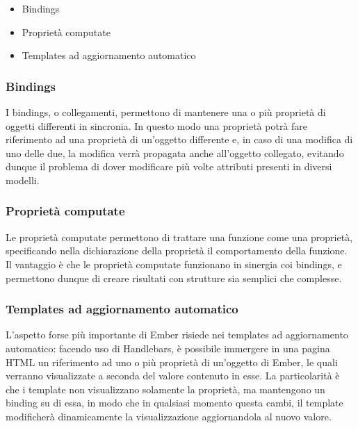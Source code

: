\begin{itemize}
    \item Bindings
    \item Proprietà computate
    \item Templates ad aggiornamento automatico
\end{itemize}

\subsubsection{Bindings} %
\label{ssub:bindings}
I bindings, o collegamenti, permettono di mantenere una o più proprietà di oggetti differenti in sincronia. In questo modo una proprietà potrà fare riferimento ad una proprietà di un'oggetto differente e, in caso di una modifica di uno delle due, la modifica verrà propagata anche all'oggetto collegato, evitando dunque il problema di dover modificare più volte attributi presenti in diversi modelli.

\subsubsection{Proprietà computate} %
\label{ssub:propriet_computate}
Le proprietà computate permettono di trattare una funzione come una proprietà, specificando nella dichiarazione della proprietà il comportamento della funzione. Il vantaggio è che le proprietà computate funzionano in sinergia coi bindings, e permettono dunque di creare risultati con strutture sia semplici che complesse.

\subsubsection{Templates ad aggiornamento automatico} %
\label{ssub:templates_ad_aggiornamento_automatico}
L'aspetto forse più importante di Ember risiede nei templates ad aggiornamento automatico: facendo uso di Handlebars, è possibile immergere in una pagina HTML un riferimento ad uno o più proprietà di un'oggetto di Ember, le quali verranno visualizzate a seconda del valore contenuto in esse. La particolarità è che i template non visualizzano solamente la proprietà, ma mantengono un binding su di essa, in modo che in qualsiasi momento questa cambi, il template modificherà dinamicamente la visualizzazione aggiornandola al nuovo valore.

